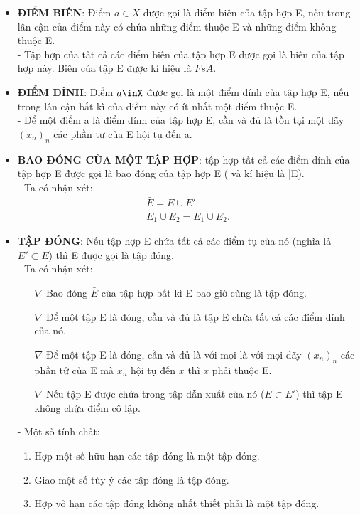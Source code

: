 \documentclass[12pt,a4paper]{article}
\begin{document}
\begin{itemize}
\item{\textbf{ĐIỂM BIÊN}: Điểm $a\in X$ được gọi là {\color{red}điểm biên} của tập hợp E, nếu trong lân cận của điểm này có chứa những điểm thuộc E và những điểm không thuộc E.\\

- Tập hợp của tất cả các điểm biên của tập hợp E được gọi là {\color{red}biên} của tập hợp này. Biên của tập E được kí hiệu là $FsA$.}

\item{\textbf{ĐIỂM DÍNH}: Điểm $a\inX$ được gọi là một {\color{red}điểm dính} của tập hợp E, nếu trong lân cận bất kì của điểm này có ít nhất một điểm thuộc E.\\

- Để một điểm a là điểm dính của tập hợp E, cần và đủ là tồn tại một dãy $(x_n)_n$ các phần tư của E hội tụ đến a.}

\item{\textbf{BAO ĐÓNG CỦA MỘT TẬP HỢP}: tập hợp tất cả các điểm dính của tập hợp E được gọi là {\color{red}bao đóng} của tập hợp E ( và kí hiệu là \bar{E}).\\

- Ta có nhận xét:
\begin{align}
\bar E = E \cup E'. \\
\bar{ E_1 \cup E_2 } = \bar{E_1} \cup \bar{E_2}.
\end{align}
}

\item{\textbf{TẬP ĐÓNG}: Nếu tập hợp E chứa tất cả các điểm tụ của nó (nghĩa là $E' \subset E$) thì E được gọi là {\color{red}tập đóng}.\\

- Ta có nhận xét:
\begin{itemize}
\item[$\nabla$]{Bao đóng $\bar E$ của tập hợp bất kì E bao giờ cũng là tập đóng.}
\item[$\nabla$]{Để một tập E là đóng, cần và đủ là tập E chứa tất cả các điểm dính của nó.}
\item[$\nabla$]{Để một tập E là đóng, cần và đủ là với mọi là với mọi dãy $(x_n)_n$ các phần tử của E mà $x_n$ hội tụ đến $x$ thì $x$ phải thuộc E.}
\item[$\nabla$]{Nếu tập E được chứa trong tập dẫn xuất của nó ($E \subset E'$) thì tập E không chứa điểm cô lập.}
\end{itemize}

- Một số tính chất:
\begin{enumerate}
\item{Hợp một số hữu hạn các tập đóng là một tập đóng.}
\item{Giao một số tùy ý các tập đóng là tập đóng.}
\item{Hợp vô hạn các tập đóng không nhất thiết phải là một tập đóng.}
\end{enumerate}
}


\end{itemize}
\end{document}

